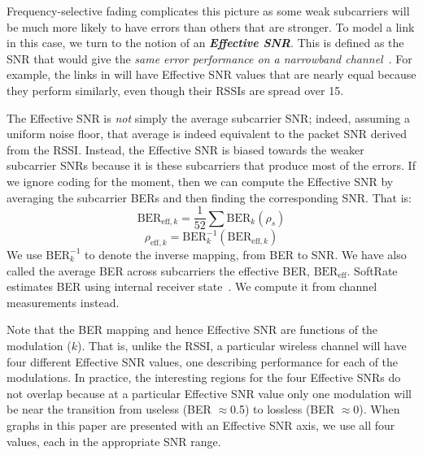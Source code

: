 Frequency-selective fading complicates this picture as some weak subcarriers will be much more likely to have errors than others that are stronger. To model a link in this case, we turn to the notion of an \textbf{\em Effective SNR}\@. This is defined as the SNR that would give the \emph{same error performance on a narrowband channel}~\cite{Nanda_effectiveSNR}. For example, the links in  will have Effective SNR values that are nearly equal because they perform similarly, even though their RSSIs are spread over 15\dB.

The Effective SNR is \emph{not} simply the average subcarrier SNR; indeed, assuming a uniform noise floor, that average is indeed equivalent to the packet SNR derived from the RSSI\@. Instead, the Effective SNR is biased towards the weaker subcarrier SNRs because it is these subcarriers that produce most of the errors. If we ignore coding for the moment, then we can compute the Effective SNR by averaging the subcarrier BERs and then finding the corresponding SNR\@. That is:
\begin{equation}
\label{eq:effective_ber}
	\text{BER}_{\text{eff},k} = \frac{1}{52} \sum \text{BER}_k(\rho_s)
\end{equation}
\begin{equation}
\label{eq:effective_snr}
	\rho_{\text{eff},k} = \text{BER}_k^{-1}(\text{BER}_{\text{eff},k})
\end{equation}
We use $\text{BER}_k^{-1}$ to denote the inverse mapping, from BER to SNR\@. We have also called the average BER across subcarriers the effective BER, $\text{BER}_{\text{eff}}$. SoftRate estimates BER using internal receiver state~\cite{Vutukuru_SoftRate}. We compute it from channel measurements instead.

Note that the BER mapping and hence Effective SNR are functions of the modulation ($k$). That is, unlike the RSSI, a particular wireless channel will have four different Effective SNR values, one describing performance for each of the modulations. In practice, the interesting regions for the four Effective SNRs do not overlap because at a particular Effective SNR value only one modulation will be near the transition from useless (BER $\approx$0.5) to lossless (BER $\approx$0). When graphs in this paper are presented with an Effective SNR axis, we use all four values, each in the appropriate SNR range.

